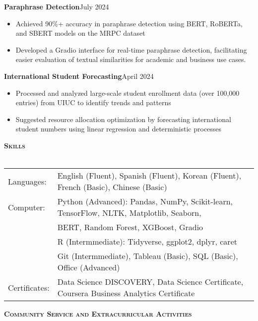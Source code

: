 \documentclass[a4paper]{article}
\newcommand{\lineunder} {
    \vspace*{-8pt} \\
    \hspace*{-18pt} \hrulefill \\
}
\newcommand{\header} [1] {
    {\hspace*{-18pt}\vspace*{6pt} \textsc{#1}}
    \vspace*{-6pt} \lineunder
}
\begin{document}
\textbf{Paraphrase Detection}\hfill{July 2024}\\
\begin{itemize}[nolistsep]
    \item Achieved 90\%+ accuracy in paraphrase detection using BERT, RoBERTa,
     and SBERT models on the MRPC dataset
    \item Developed a Gradio interface for real-time paraphrase detection, facilitating easier evaluation 
    of textual similarities for academic and business use cases.
\end{itemize}

\textbf{International Student Forecasting}\hfill{April 2024}\\
\begin{itemize}[nolistsep]
    \item Processed and analyzed large-scale student enrollment data 
    (over 100,000 entries) from UIUC to identify trends and patterns
    \item Suggested resource allocation optimization by forecasting 
    international student numbers using linear regression and deterministic processes
    \end{itemize}



\vspace*{1mm}

\header{\textbf{Skills}}
\begin{tabular}{ l l }
    Languages: & English (Fluent), Spanish (Fluent), Korean (Fluent), French (Basic), Chinese (Basic)              \\
    Computer: & Python (Advanced): Pandas, NumPy, Scikit-learn, TensorFlow, 
    NLTK, Matplotlib, Seaborn, \\
    & BERT, Random Forest, XGBoost, Gradio\\
    & R (Intermmediate): Tidyverse, ggplot2, dplyr, caret\\
    & Git (Intermmediate), Tableau (Basic), SQL (Basic), Office (Advanced)\\
    Certificates: & Data Science DISCOVERY, Data Science Certificate, 
    Coursera Business Analytics Certificate
\end{tabular}


\vspace{1mm}


\header{\textbf{Community Service and Extracurricular Activities}}
\end{document}
